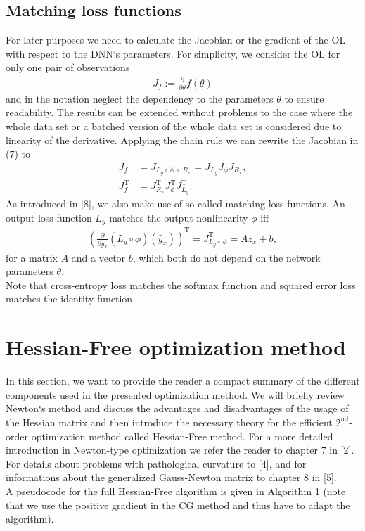 \documentclass[conference]{IEEEtran}
\begin{document}
	\subsection{Matching loss functions}
	\noindent
	For later purposes we need to calculate the Jacobian or the gradient of the OL with respect to the DNN`s parameters. For simplicity, we consider the OL for only one pair of observations
	\begin{align}
	J_{f} := \frac{\partial}{\partial\theta}f(\theta)
	\end{align}
	and in the notation neglect the dependency to the parameters $\theta$ 
	to ensure readability.
	The results can be extended without problems to the case where the whole data set or a batched version of the whole data set is considered due to linearity of the derivative.
	Applying the chain rule we can rewrite the Jacobian in (7) to
	\begin{align}
	J_{f} &= J_{L_{y}\circ \:\phi \:\circ\:R_{x}} = J_{L_{y}} J_{\phi} J_{R_{x}},\\
	J_{f}^{\mathrm{T}} &= J_{R_{x}}^{\mathrm{T}}  J_{\phi}^{\mathrm{T}}  J_{L_{y}}^{\mathrm{T}}.
	\end{align}
	As introduced in [8], we also make use of so-called matching loss functions. An output loss function $L_{y}$ matches the output nonlinearity $\phi$ iff
	\begin{align}
	\left(\frac{\partial}{\partial\hat{y}_{x}}\left(L_{y}\circ \phi\right)(\hat{y}_{x})\right)^{\mathrm{T}}= J_{L_{y}\circ \:\phi}^{\mathrm{T}} = A z_{x} + b,
	\end{align}
	for a matrix $A$ and a vector $b$, which both do not depend on the network parameters $\theta$.\\
	Note that cross-entropy loss matches the softmax function and squared error loss matches the identity function.


	\section{Hessian-Free optimization method}
	\noindent
	In this section, we want to provide the reader a compact summary of the different components used in the presented optimization method. We will briefly review Newton`s method and discuss the advantages and disadvantages of the usage of the Hessian matrix and then introduce the necessary theory for the efficient $2^{\text{nd}}$-order optimization method called Hessian-Free method. For a more detailed introduction in Newton-type optimization we refer the reader to chapter 7 in [2]. For details about problems with pathological curvature to [4], and for informations about the generalized Gauss-Newton matrix to chapter 8 in [5].\\
	A pseudocode for the full Hessian-Free algorithm is given in Algorithm 1 (note that we use the positive gradient in the CG method and thus have to adapt the algorithm).
\end{document}

